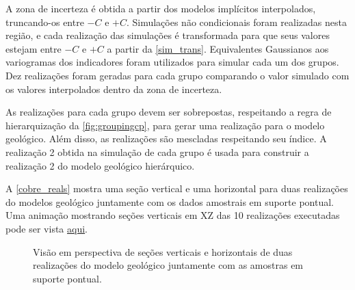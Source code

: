 A zona de incerteza é obtida a partir dos modelos implícitos interpolados, truncando-os entre $-C$ e $+C$. Simulações não condicionais foram realizadas nesta região, e cada realização das simulações é transformada para que seus valores estejam entre $-C$ e $+ C$ a partir da \autoref{sim_trans}. Equivalentes Gaussianos aos variogramas dos indicadores foram utilizados para simular cada um dos grupos. Dez realizações foram geradas para cada grupo comparando o valor simulado com os valores interpolados dentro da zona de incerteza. 

As realizações para cada grupo devem ser sobrepostas, respeitando a regra de hierarquização da \autoref{fig:groupingcp}, para gerar uma realização para o modelo geológico. Além disso, as realizações são mescladas respeitando seu índice. A realização 2 obtida na simulação de cada grupo é usada para construir a realização 2 do modelo geológico hierárquico.

A \autoref{cobre_reals} mostra uma seção vertical e uma horizontal para duas realizações do modelos geológico juntamente com os dados amostrais em suporte pontual. Uma animação mostrando seções verticais em XZ das 10 realizações executadas pode ser vista \href{https://github.com/robertorolo/hierarchical_boundary_simulation/blob/main/copper_gif.gif}{aqui}.

\begin{figure}[H]
	\caption{\label{cobre_reals} Visão em perspectiva de seções verticais e horizontais de duas realizações do modelo geológico juntamente com as amostras em suporte pontual.}
	\centering
     \hspace{1em}
\end{figure}

